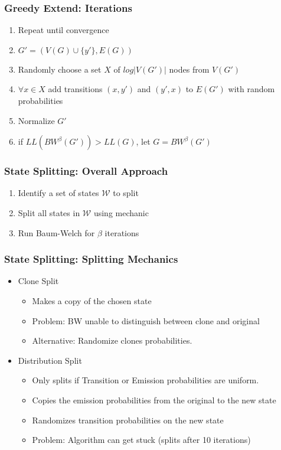 \begin{frame}
  \frametitle{Greedy Extend: Iterations} 
  
	\begin{enumerate}
		\item Repeat until convergence
		\item $G' = (V(G) \cup \{y'\}, E(G))$ 
		\item Randomly choose a set $X$ of $log \vert V(G') \vert$ nodes from $V(G')$ 
		\item $\forall x \in X$ add transitions $(x,y')$ and $(y',x)$ to $E(G')$ with random probabilities
		\item Normalize $G'$
		\item if $LL(BW^\beta(G')) > LL(G)$, let $G = BW^\beta(G')$
	\end{enumerate}

  
\end{frame}


\begin{frame}
  \frametitle{State Splitting: Overall Approach} 
  \begin{enumerate}
  	\item Identify a set of states $\mathcal{W}$ to split
  	\item Split all states in $\mathcal{W}$ using mechanic
  	\item Run Baum-Welch for $\beta$ iterations
  \end{enumerate}
     
\end{frame}



\begin{frame}
  \frametitle{State Splitting: Splitting Mechanics} 
  \begin{itemize}
  	\item Clone Split
  		\begin{itemize}
  			\item Makes a copy of the chosen state
  			\item Problem: BW unable to distinguish between clone and original
  			\item Alternative: Randomize clones probabilities.
  		\end{itemize}
  	\item Distribution Split
  		\begin{itemize}
  			\item Only splits if Transition or Emission probabilities are uniform.
  			\item Copies the emission probabilities from the original to the new state 
  			\item Randomizes transition probabilities on the new state
  			\item Problem: Algorithm can get stuck (splits after 10 iterations)
  		\end{itemize}
  \end{itemize}
  
\end{frame}

